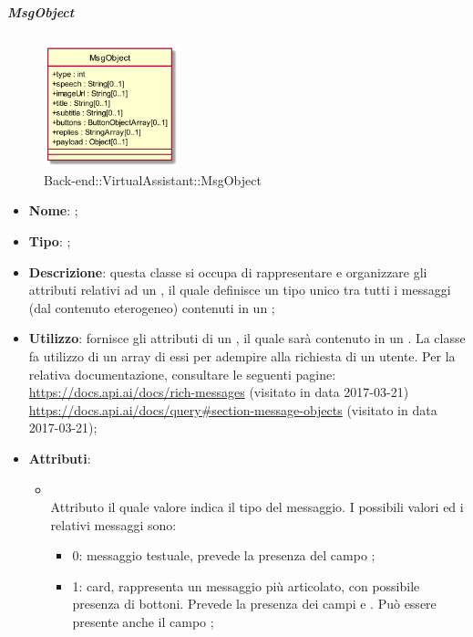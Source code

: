 \hypertarget{MsgObject_label}{\subparagraph{MsgObject}}
\begin{figure}[h]
	\centering
	\includegraphics[width=0.35\textwidth,height=\textheight,keepaspectratio]{images/ClassMsgObject.png}
	\caption{Back-end::VirtualAssistant::MsgObject}
\end{figure}
\begin{itemize}
	\item \textbf{Nome}: ;
	\item \textbf{Tipo}: ;
	\item \textbf{Descrizione}: questa classe si occupa di rappresentare e organizzare gli attributi relativi ad un , il quale definisce un tipo unico tra tutti i messaggi (dal contenuto eterogeneo) contenuti in un ;
	\item \textbf{Utilizzo}: fornisce gli attributi di un , il quale sarà contenuto in un .
	La classe  fa utilizzo di un array di essi per adempire alla richiesta di un utente.
	Per la relativa documentazione, consultare le seguenti pagine: \\
	\url{https://docs.api.ai/docs/rich-messages}  (visitato in data 2017-03-21)\\
	\url{https://docs.api.ai/docs/query#section-message-objects} (visitato in data 2017-03-21);
	\item \textbf{Attributi}:
	\begin{itemize}
		\item[]  \\
		Attributo il quale valore indica il tipo del messaggio. I possibili valori ed i relativi messaggi sono:
		\begin{itemize}
			\item 0: messaggio testuale, prevede la presenza del campo ;
			\item 1: card, rappresenta un messaggio più articolato, con possibile presenza di bottoni. Prevede la presenza dei campi  e . Può essere presente anche il campo ;

\end{itemize}
\end{itemize}
\end{itemize}

